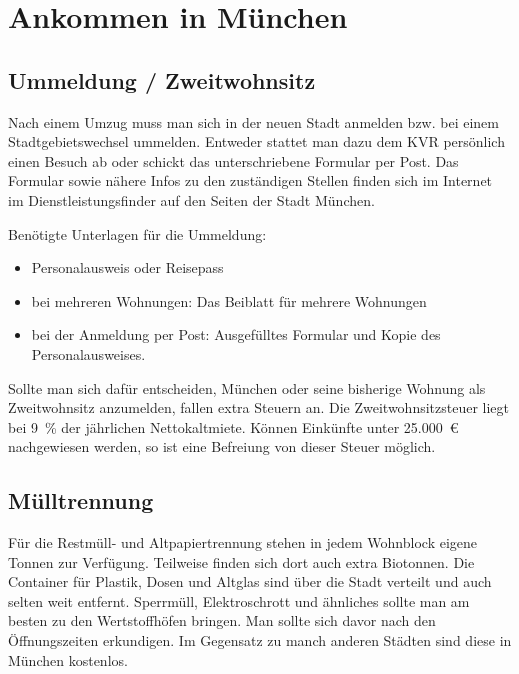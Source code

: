 ﻿\chapter{Ankommen in München}

\section{Ummeldung / Zweitwohnsitz}

Nach einem Umzug muss man sich in der neuen Stadt anmelden bzw. bei einem Stadtgebietswechsel ummelden. Entweder stattet man dazu dem KVR persönlich einen Besuch ab oder schickt das unterschriebene Formular per Post. Das Formular sowie nähere Infos zu den zuständigen Stellen finden sich im Internet im Dienstleistungsfinder auf den Seiten der Stadt München.

Benötigte Unterlagen für die Ummeldung: %
\begin{itemize}
	\item Personalausweis oder Reisepass
	\item bei mehreren Wohnungen: Das Beiblatt für mehrere Wohnungen
	\item bei der Anmeldung per Post: Ausgefülltes Formular und Kopie des Personalausweises.
\end{itemize}

Sollte man sich dafür entscheiden, München oder seine bisherige Wohnung als Zweitwohnsitz anzumelden, fallen extra Steuern an. Die Zweitwohnsitzsteuer liegt bei 9~\% der jährlichen Nettokaltmiete. Können Einkünfte unter 25.000~€ nachgewiesen werden, so ist eine Befreiung von dieser Steuer möglich.

\begin{urlList}
\end{urlList}

\section{Mülltrennung}

Für die Restmüll- und Altpapiertrennung stehen in jedem Wohnblock eigene Tonnen zur Verfügung. Teilweise finden sich dort auch extra Biotonnen.
Die Container für Plastik, Dosen und Altglas sind über die Stadt verteilt und auch selten weit entfernt.
Sperrmüll, Elektroschrott und ähnliches sollte man am besten zu den Wertstoffhöfen bringen. Man sollte sich davor nach den Öffnungszeiten erkundigen. Im Gegensatz zu manch anderen Städten sind diese in München kostenlos.

